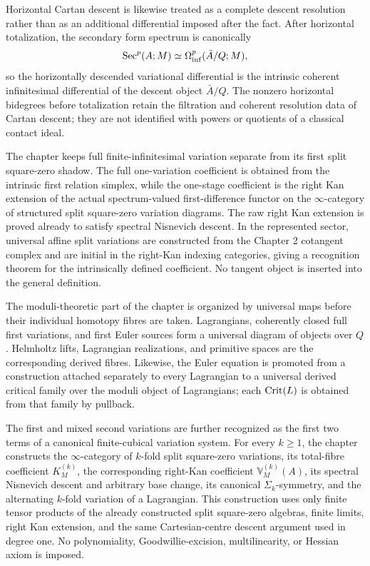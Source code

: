 Horizontal Cartan descent is likewise treated as a complete descent resolution rather than as an additional differential imposed after the fact. After horizontal totalization, the secondary form spectrum is canonically
\[
    \operatorname{Sec}^p(A;M)
    \simeq
    \Omega_{\mathrm{inf}}^p(\bar A/Q;M),
\]
so the horizontally descended variational differential is the intrinsic coherent infinitesimal differential of the descent object \(\bar A/Q\). The nonzero horizontal bidegrees before totalization retain the filtration and coherent resolution data of Cartan descent; they are not identified with powers or quotients of a classical contact ideal.

The chapter keeps full finite-infinitesimal variation separate from its first split square-zero shadow. The full one-variation coefficient is obtained from the intrinsic first relation simplex, while the one-stage coefficient is the right Kan extension of the actual spectrum-valued first-difference functor on the \(\infty\)-category of structured split square-zero variation diagrams. The raw right Kan extension is proved already to satisfy spectral Nisnevich descent. In the represented sector, universal affine split variations are constructed from the Chapter 2 cotangent complex and are initial in the right-Kan indexing categories, giving a recognition theorem for the intrinsically defined coefficient. No tangent object is inserted into the general definition.

The moduli-theoretic part of the chapter is organized by universal maps before their individual homotopy fibres are taken. Lagrangians, coherently closed full first variations, and first Euler sources form a universal diagram of objects over \(Q\). Helmholtz lifts, Lagrangian realizations, and primitive spaces are the corresponding derived fibres. Likewise, the Euler equation is promoted from a construction attached separately to every Lagrangian to a universal derived critical family over the moduli object of Lagrangians; each \(\operatorname{Crit}(L)\) is obtained from that family by pullback.

The first and mixed second variations are further recognized as the first two terms of a canonical finite-cubical variation system. For every \(k\ge1\), the chapter constructs the \(\infty\)-category of \(k\)-fold split square-zero variations, its total-fibre coefficient \(K_M^{(k)}\), the corresponding right-Kan coefficient \(\mathbb V_M^{(k)}(A)\), its spectral Nisnevich descent and arbitrary base change, its canonical \(\Sigma_k\)-symmetry, and the alternating \(k\)-fold variation of a Lagrangian. This construction uses only finite tensor products of the already constructed split square-zero algebras, finite limits, right Kan extension, and the same Cartesian-centre descent argument used in degree one. No polynomiality, Goodwillie-excision, multilinearity, or Hessian axiom is imposed.

